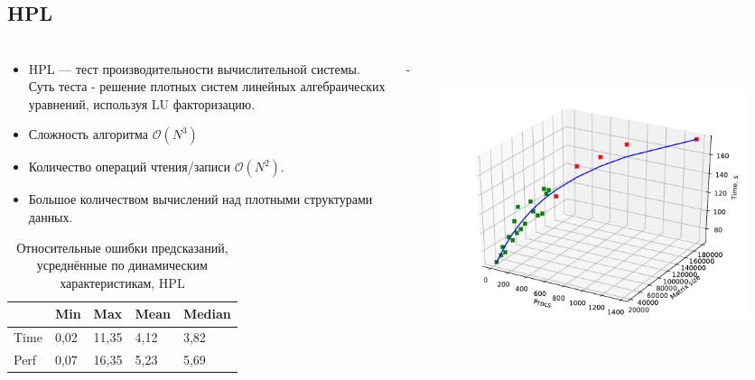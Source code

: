 \documentclass[unicode, t, 11pt]{beamer}%
\newlength{\mylen}
\begin{document}
		\subsection{HPL}
		\begin{frame}
			\footnotesize
			\frametitle{\insertsection}
	 		\framesubtitle{\insertsubsection}
	 		\begin{columns}[T]
	 			\setlength{\mylen}{0.49\textwidth}
	 			\begin{column}{\mylen}
	 				\begin{itemize}[label = \(\bullet\)]
				 		\item HPL — тест производительности вычислительной системы. Суть теста - решение плотных систем линейных алгебраических уравнений, используя LU факторизацию.
				 		\item Сложность алгоритма \(\mathcal{O}(N^3)\)
				 		\item Количество операций чтения/записи \(\mathcal{O}(N^2)\).
				 		\item Большое количеством вычислений над плотными структурами данных.
				 	\end{itemize}
				 	\begin{table}
			 			\captionsetup{font=tiny, labelfont=tiny}
			 			\tiny
							\begin{tabularx}{\textwidth}{|X|X|X|X|X|}%
								\hline
								     & Min  & Max   & Mean & Median \\ \hline
								Time & 0,02 & 11,35 & 4,12 & 3,82   \\ \hline
								Perf & 0,07 & 16,35 & 5,23 & 5,69   \\ \hline
							\end{tabularx}
						\caption{Относительные ошибки предсказаний, усреднённые по динамическим характеристикам, HPL}
					\end{table}
	 			\end{column}
	 			\begin{column}{\dimexpr\textwidth-\mylen}
		 			\begin{figure}
						\captionsetup{font=tiny, labelfont=tiny}
						\includegraphics[width=.9\textwidth]{./images/fig_hpl_k3}%

\end{figure}
\end{column}
\end{columns}
\end{frame}
\end{document}

